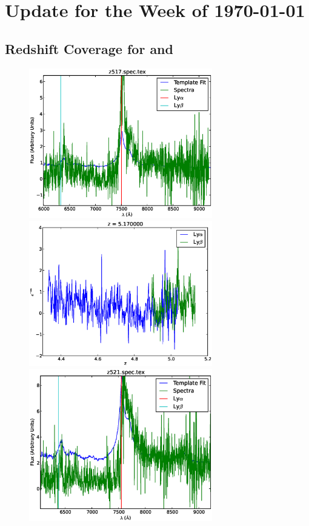 \documentclass[11pt]{article}
\begin{document}
\section*{Update for the Week of \today}

\subsection*{Redshift Coverage for \lya and \lyb}

\begin{figure}[h]
  \centering
  \includegraphics[width=8cm]{z517.spec.eps}
  \includegraphics[width=8cm]{z517.spec_Transmission.eps}
  \includegraphics[width=8cm]{z521.spec.eps}

\end{figure}
\end{document}
